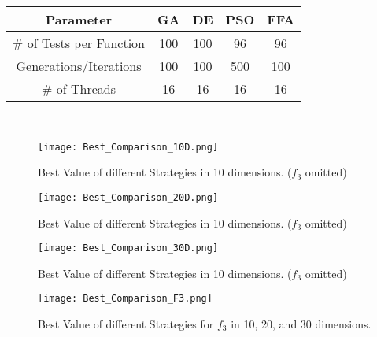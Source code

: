 \documentclass[paper=a4, fontsize=11pt]{scrartcl} %
\numberwithin{equation}{section} %
\numberwithin{figure}{section} %
\numberwithin{table}{section} %
\begin{document}
	\begin{minipage}{\linewidth}
		\centering
		\begin{tabular}{c|cccc}\label{T41}
			Parameter       			& GA 		& DE   	& PSO	& FFA	\\
			\hline
			\# of Tests per Function	& 100		& 100	& 96	& 96	\\
			Generations/Iterations		& 100		& 100	& 500	& 100	\\
			\# of Threads				& 16		& 16	& 16	& 16	\\
		\end{tabular}
		\bigskip\\
	\end{minipage}

\begin{figure}[!ht]
	\texttt{[image: Best\_Comparison\_10D.png]}
	\caption{Best Value of different Strategies in 10 dimensions. ($f_3$ omitted)}
	\label{F_Best10}
\end{figure}
\begin{figure}[!ht]
	\texttt{[image: Best\_Comparison\_20D.png]}
	\caption{Best Value of different Strategies in 10 dimensions. ($f_3$ omitted)}
	\label{F_Best20}
\end{figure}
\begin{figure}[!ht]
	\texttt{[image: Best\_Comparison\_30D.png]}
	\caption{Best Value of different Strategies in 10 dimensions. ($f_3$ omitted)}
	\label{F_Best30}
\end{figure}
\begin{figure}[!ht]
	\texttt{[image: Best\_Comparison\_F3.png]}
	\caption{Best Value of different Strategies for $f_3$ in 10, 20, and 30 dimensions.}
	\label{F_Best3}
\end{figure}


\pagebreak
\end{document}
